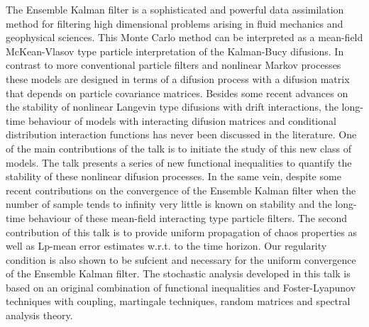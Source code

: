 The Ensemble Kalman filter is a sophisticated and powerful
data assimilation method for filtering high dimensional problems
arising in fluid mechanics and geophysical sciences. This Monte Carlo
method can be interpreted as a mean-field McKean-Vlasov type
particle interpretation of the Kalman-Bucy difusions. In contrast to
more conventional particle filters and nonlinear Markov processes
these models are designed in terms of a difusion process with a
difusion matrix that depends on particle covariance matrices.
Besides some recent advances on the stability of nonlinear Langevin
type difusions with drift interactions, the long-time behaviour of
models with interacting difusion matrices and conditional
distribution interaction functions has never been discussed in the
literature. One of the main contributions of the talk is to initiate the
study of this new class of models. The talk presents a series of new
functional inequalities to quantify the stability of these nonlinear difusion processes. In the same vein, despite some recent
contributions on the convergence of the Ensemble Kalman filter when
the number of sample tends to infinity very little is known on stability
and the long-time behaviour of these mean-field interacting type
particle filters. The second contribution of this talk is to provide
uniform propagation of chaos properties as well as Lp-mean error
estimates w.r.t. to the time horizon. Our regularity condition is also
shown to be sufcient and necessary for the uniform convergence of
the Ensemble Kalman filter. The stochastic analysis developed in this
talk is based on an original combination of functional inequalities and
Foster-Lyapunov techniques with coupling, martingale techniques,
random matrices and spectral analysis theory.